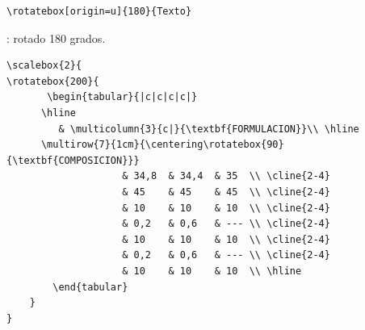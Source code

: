 \documentclass[a4,10pt]{aleph-notas}
\begin{document}
\begin{lstlisting}[frame=single]
\rotatebox[origin=u]{180}{Texto}
\end{lstlisting}

\begin{center}
    : rotado 180 grados.
\end{center}


\begin{lstlisting}[frame=single]
\scalebox{2}{
\rotatebox{200}{
       \begin{tabular}{|c|c|c|c|}
      \hline
         & \multicolumn{3}{c|}{\textbf{FORMULACION}}\\ \hline
      \multirow{7}{1cm}{\centering\rotatebox{90}{\textbf{COMPOSICION}}} 
                    & 34,8  & 34,4  & 35  \\ \cline{2-4}
                    & 45    & 45    & 45  \\ \cline{2-4}
                    & 10    & 10    & 10  \\ \cline{2-4}
                    & 0,2   & 0,6   & --- \\ \cline{2-4}
                    & 10    & 10    & 10  \\ \cline{2-4}
                    & 0,2   & 0,6   & --- \\ \cline{2-4}
                    & 10	& 10    & 10  \\ \hline
        \end{tabular}
    }
}
\end{lstlisting}
\end{document}
